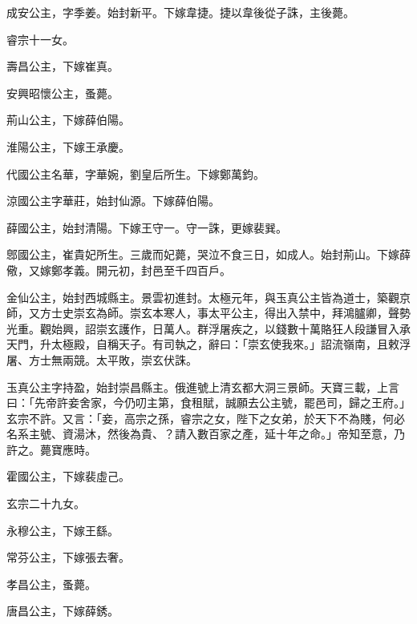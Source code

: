 \begin{pinyinscope}
 成安公主，字季姜。始封新平。下嫁韋捷。捷以韋後從子誅，主後薨。



 睿宗十一女。



 壽昌公主，下嫁崔真。



 安興昭懷公主，蚤薨。



 荊山公主，下嫁薛伯陽。



 淮陽公主，下嫁王承慶。



 代國公主名華，字華婉，劉皇后所生。下嫁鄭萬鈞。



 涼國公主字華莊，始封仙源。下嫁薛伯陽。



 薛國公主，始封清陽。下嫁王守一。守一誅，更嫁裴巽。



 鄎國公主，崔貴妃所生。三歲而妃薨，哭泣不食三日，如成人。始封荊山。下嫁薛儆，又嫁鄭孝義。開元初，封邑至千四百戶。



 金仙公主，始封西城縣主。景雲初進封。太極元年，與玉真公主皆為道士，築觀京師，又方士史崇玄為師。崇玄本寒人，事太平公主，得出入禁中，拜鴻臚卿，聲勢光重。觀始興，詔崇玄護作，日萬人。群浮屠疾之，以錢數十萬賂狂人段謙冒入承天門，升太極殿，自稱天子。有司執之，辭曰：「崇玄使我來。」詔流嶺南，且敕浮屠、方士無兩競。太平敗，崇玄伏誅。



 玉真公主字持盈，始封崇昌縣主。俄進號上清玄都大洞三景師。天寶三載，上言曰：「先帝許妾舍家，今仍叨主第，食租賦，誠願去公主號，罷邑司，歸之王府。」玄宗不許。又言：「妾，高宗之孫，睿宗之女，陛下之女弟，於天下不為賤，何必名系主號、資湯沐，然後為貴、？請入數百家之產，延十年之命。」帝知至意，乃許之。薨寶應時。



 霍國公主，下嫁裴虛己。



 玄宗二十九女。



 永穆公主，下嫁王繇。



 常芬公主，下嫁張去奢。



 孝昌公主，蚤薨。



 唐昌公主，下嫁薛銹。




\end{pinyinscope}
